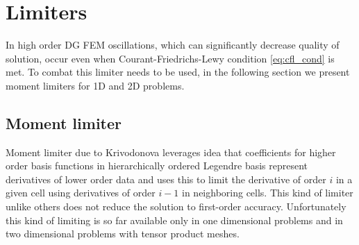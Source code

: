 \newpage
\section{Limiters}
\label{se:limiters}
In high order DG FEM oscillations, which can significantly decrease quality of 
solution, occur even when Courant-Friedrichs-Lewy condition \eqref{eq:cfl_cond} is met. 
To combat this limiter needs to be used, in the following section we present moment 
limiters for 1D and 
2D problems.

\subsection{Moment limiter}
Moment limiter due to Krivodonova \cite{Krivodonova2007} leverages idea that 
coefficients for higher order basis functions in hierarchically ordered 
Legendre basis represent derivatives of lower order data and uses this to 
limit the derivative of order $i$ in a given cell using derivatives of order 
$i - 1$ in neighboring cells. This kind of limiter unlike others does not 
reduce the solution to first-order accuracy. Unfortunately this kind of 
limiting is so far available only in one dimensional problems and in two 
dimensional problems with tensor product meshes.

